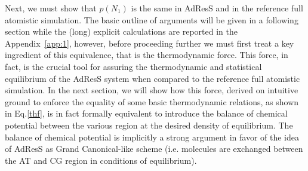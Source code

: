\documentclass[aps,a4paper,reprint,onecolumn]{revtex4}
\begin{document}
Next, we must show that $p(N_{1})$ is the same in AdResS and in the reference full atomistic simulation. The basic outline of arguments will be given in a following section while the (long) explicit calculations are reported in the Appendix~\ref{app:1}, however, before proceeding further we must first treat a key ingredient of this equivalence, that is the thermodynamic force. This force, in fact, is the crucial tool for assuring the thermodynamic and statistical equilibrium of the AdResS system when compared to the reference full atomistic simulation. In the next section, we will show how this force, derived on intuitive ground to enforce the equality of some basic thermodynamic relations, as shown in Eq.\ref{thf}, is in fact formally equivalent to introduce the balance of chemical potential between the various region at the desired density of equilibrium. The balance of chemical potential is implicitly a strong argument in favor of the idea of AdResS as Grand Canonical-like scheme (i.e. molecules are exchanged between the AT and CG region in conditions of equilibrium). 
\end{document}
